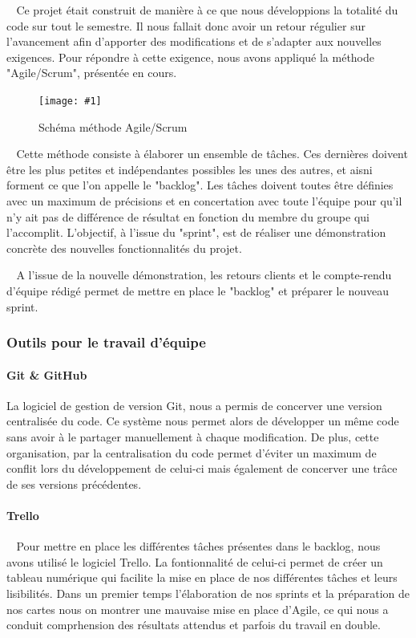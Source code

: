 \documentclass[12pt]{article}
\def\tab{$\>\>\>\>$}
\newcommand\img[2]{
\begin{figure}[!h]
  \centering
    \texttt{[image: \#1]}
  \caption{#2}
  \label{img:#1}
\end{figure}
}
\begin{document}
\tab Ce projet était construit de manière à ce que nous développions la totalité du code sur tout le semestre. Il nous fallait donc avoir un retour régulier sur l'avancement afin d'apporter des modifications et de s'adapter aux nouvelles exigences. Pour répondre à cette exigence, nous avons appliqué la méthode "Agile/Scrum", présentée en cours.

\img{Images/VueGlobaleScrum.png}{Schéma méthode Agile/Scrum}

\tab Cette méthode consiste à élaborer un ensemble de tâches. Ces dernières doivent être les plus petites et indépendantes possibles les unes des autres, et aisni forment ce que l'on appelle le "backlog". Les tâches doivent toutes être définies avec un maximum de précisions et en concertation avec toute l'équipe pour qu'il n'y ait pas de différence de résultat en fonction du membre du groupe qui l'accomplit. L'objectif, à l'issue du "sprint", est de réaliser une démonstration concrète des nouvelles fonctionnalités du projet.

\tab A l'issue de la nouvelle démonstration, les retours clients et le compte-rendu d'équipe rédigé permet de mettre en place le "backlog" et préparer le nouveau sprint.

\newpage

\subsubsection{Outils pour le travail d'équipe}
\paragraph{Git \& GitHub\\}
La logiciel de gestion de version Git, nous a permis de concerver une version centralisée du code. Ce système nous permet alors de développer un même code sans avoir à le partager manuellement à chaque modification. De plus, cette organisation, par la centralisation du code permet d'éviter un maximum de conflit lors du développement de celui-ci mais également de concerver une trâce de ses versions précédentes.

\paragraph{Trello\\}
\tab Pour mettre en place les différentes tâches présentes dans le backlog, nous avons utilisé le logiciel Trello. La fontionnalité de celui-ci permet de créer un tableau numérique qui facilite la mise en place de nos différentes tâches et leurs lisibilités. Dans un premier temps l'élaboration de nos sprints et la préparation de nos cartes nous on montrer une mauvaise mise en place d'Agile, ce qui nous a conduit comprhension des résultats attendus et parfois du travail en double.
\end{document}
